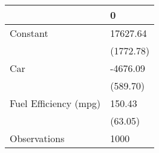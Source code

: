 \begin{tabular}{ll}
\toprule
{} &          0 \\
\midrule
Constant              &   17627.64 \\
                      &  (1772.78) \\
Car                   &   -4676.09 \\
                      &   (589.70) \\
Fuel Efficiency (mpg) &     150.43 \\
                      &    (63.05) \\
Observations          &       1000 \\
\bottomrule
\end{tabular}
